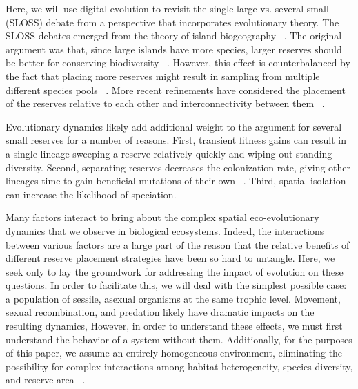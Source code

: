 \documentclass[letterpaper]{article}
\begin{document}
    Here, we will use digital evolution to revisit the single-large vs. several small (SLOSS) debate from a perspective that incorporates evolutionary theory. The SLOSS debates emerged from the theory of island biogeography ~\citep{macarthur_theory_1967}. The original argument was that, since large islands have more species, larger reserves should be better for conserving biodiversity ~\citep{diamond_island_1975}. However, this effect is counterbalanced by the fact that placing more reserves might result in sampling from multiple different species pools ~\citep{simberloff_island_1976}. More recent refinements have considered the placement of the reserves relative to each other and interconnectivity between them ~\citep{saunders_biological_1991,tjorve_how_2010}. 

	Evolutionary dynamics likely add additional weight to the argument for several small reserves for a number of reasons. First, transient fitness gains can result in a single lineage sweeping a reserve relatively quickly and wiping out standing diversity. Second, separating reserves decreases the colonization rate, giving other lineages time to gain beneficial mutations of their own ~\citep{whitley_island_1998,tomassini_spatially_2005}. Third, spatial isolation can increase the likelihood of speciation.
%
%
%
%
%
%
%

	Many factors interact to bring about the complex spatial eco-evolutionary dynamics that we observe in biological ecosystems. Indeed, the interactions between various factors are a large part of the reason that the relative benefits of different reserve placement strategies have been so hard to untangle. Here, we seek only to lay the groundwork for addressing the impact of evolution on these questions. In order to facilitate this, we will deal with the simplest possible case: a population of sessile, asexual organisms at the same trophic level. Movement, sexual recombination, and predation likely have dramatic impacts on the resulting dynamics, However, in order to understand these effects, we must first understand the behavior of a system without them. Additionally, for the purposes of this paper, we assume an entirely homogeneous environment, eliminating the possibility for complex interactions among habitat heterogeneity, species diversity, and reserve area ~\citep{kadmon_integrating_2007}.
\end{document}
